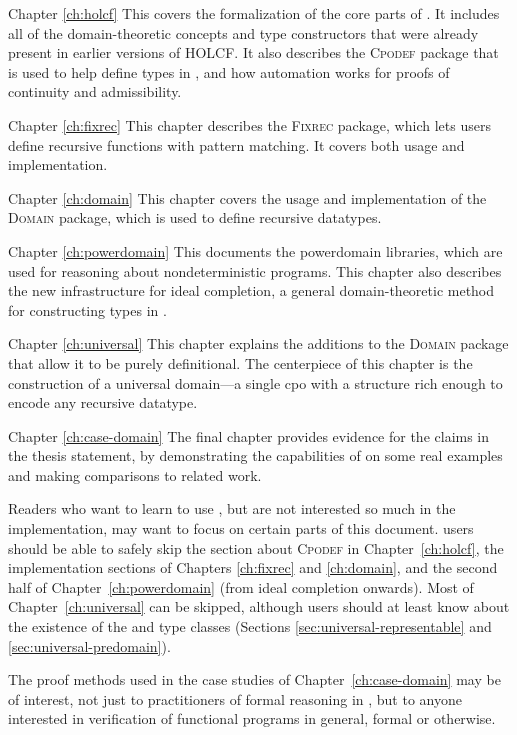 \begin{description*}

\item[Chapter \ref{ch:holcf}] This covers the formalization of the core parts of . It includes all of the domain-theoretic concepts and type constructors that were already present in earlier versions of HOLCF. It also describes the \textsc{Cpodef} package that is used to help define types in , and how automation works for proofs of continuity and admissibility.

\item[Chapter \ref{ch:fixrec}] This chapter describes the \textsc{Fixrec} package, which lets users define recursive functions with pattern matching. It covers both usage and implementation.

\item[Chapter \ref{ch:domain}] This chapter covers the usage and implementation of the \textsc{Domain} package, which is used to define recursive datatypes.

\item[Chapter \ref{ch:powerdomain}] This documents the  powerdomain libraries, which are used for reasoning about nondeterministic programs. This chapter also describes the new infrastructure for ideal completion, a general domain-theoretic method for constructing types in .

\item[Chapter \ref{ch:universal}] This chapter explains the additions to the  \textsc{Domain} package that allow it to be purely definitional. The centerpiece of this chapter is the construction of a universal domain---a single cpo with a structure rich enough to encode any recursive datatype.

\item[Chapter \ref{ch:case-domain}] The final chapter provides evidence for the claims in the thesis statement, by demonstrating the capabilities of  on some real examples and making comparisons to related work.

\end{description*}

Readers who want to learn to use , but are not interested so much in the implementation, may want to focus on certain parts of this document.  users should be able to safely skip the section about \textsc{Cpodef} in Chapter~\ref{ch:holcf}, the implementation sections of Chapters \ref{ch:fixrec} and \ref{ch:domain}, and the second half of Chapter~\ref{ch:powerdomain} (from ideal completion onwards). Most of Chapter~\ref{ch:universal} can be skipped, although  users should at least know about the existence of the  and  type classes (Sections \ref{sec:universal-representable} and \ref{sec:universal-predomain}).

The proof methods used in the case studies of Chapter~\ref{ch:case-domain} may be of interest, not just to practitioners of formal reasoning in , but to anyone interested in verification of functional programs in general, formal or otherwise.
